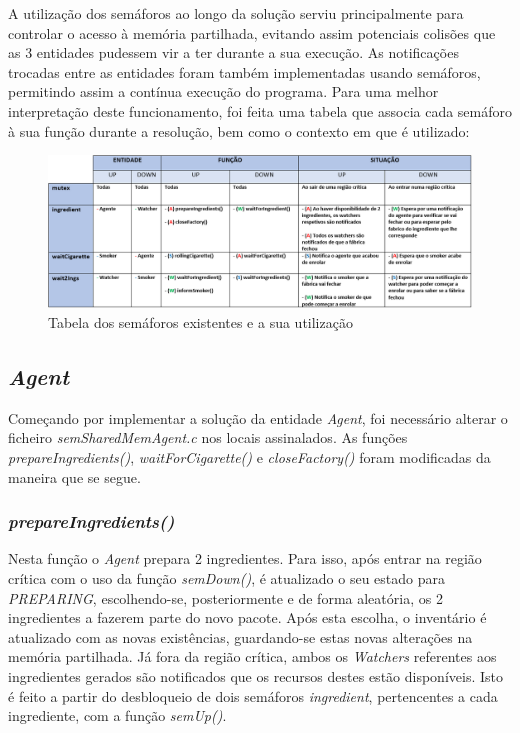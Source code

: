 \documentclass[10pt,portuguese]{article}
\begin{document}
\par A utilização dos semáforos ao longo da solução serviu principalmente para controlar o acesso à memória partilhada, evitando assim potenciais colisões que as 3 entidades pudessem vir a ter durante a sua execução. As notificações trocadas entre as entidades foram também implementadas usando semáforos, permitindo assim a contínua execução do programa. Para uma melhor interpretação deste funcionamento, foi feita uma tabela que associa cada semáforo à sua função durante a resolução, bem como o contexto em que é utilizado:\\
\begin{figure}[!h]
    \centering
    \includegraphics[width=\textwidth]{images/implementation/table.png}
    \caption{Tabela dos semáforos existentes e a sua utilização}
\end{figure}

\clearpage

\subsection{\textit{Agent}}

\par Começando por implementar a solução da entidade \textit{Agent}, foi necessário alterar o ficheiro \textit{semSharedMemAgent.c} nos locais assinalados. As funções \textit{prepareIngredients()}, \textit{waitForCigarette()} e \textit{closeFactory()} foram modificadas da maneira que se segue.

\subsubsection{\textit{prepareIngredients()}}

\par Nesta função o \textit{Agent} prepara 2 ingredientes. Para isso, após entrar na região crítica com o uso da função \textit{semDown()}, é atualizado o seu estado para \textit{PREPARING}, escolhendo-se, posteriormente e de forma aleatória, os 2 ingredientes a fazerem parte do novo pacote. Após esta escolha, o inventário é atualizado com as novas existências, guardando-se estas novas alterações na memória partilhada. Já fora da região crítica, ambos os \textit{Watchers} referentes aos ingredientes gerados são notificados que os recursos destes estão disponíveis. Isto é feito a partir do desbloqueio de dois semáforos \textit{ingredient}, pertencentes a cada ingrediente, com a função \textit{semUp()}.
\end{document}
